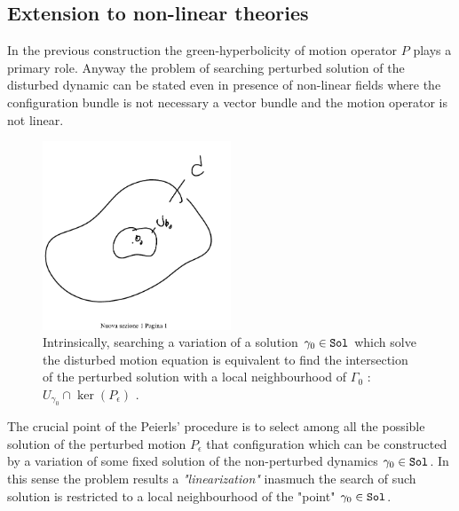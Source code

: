 \documentclass[Main]{subfiles}
\begin{document}
	\subsection{Extension to non-linear theories}
		In the previous construction the green-hyperbolicity of motion operator $P$ plays a primary role.
		Anyway the problem of searching perturbed solution of the disturbed dynamic can be stated even in presence  of non-linear fields  where the configuration bundle is not necessary a vector bundle and the motion operator is not linear.
		\begin{figure}[h!]
				  \centering
			   	\includegraphics[width=0.5\textwidth]{Pictures/Linearization} 
   	  			\caption{Intrinsically, searching a variation of a solution $\gamma_0\in \mathtt{Sol}$ which solve the disturbed motion equation is equivalent to find the intersection of the perturbed solution with a local neighbourhood of $\Gamma_0$ : $U_{\gamma_0}\cap\ker(P_\epsilon)$ .}
		\end{figure}		
		
		The crucial point of the Peierls' procedure  is to select among all the possible solution of the perturbed motion $P_\epsilon$ that configuration which can be constructed by a variation of some fixed solution of the non-perturbed dynamics $\gamma_0 \in \mathtt{Sol}$.
		In this sense the problem results a \emph{"linearization"} inasmuch the  search of such solution is restricted to a local neighbourhood of the "point" $\gamma_0\in \mathtt{Sol}$.
\end{document}
